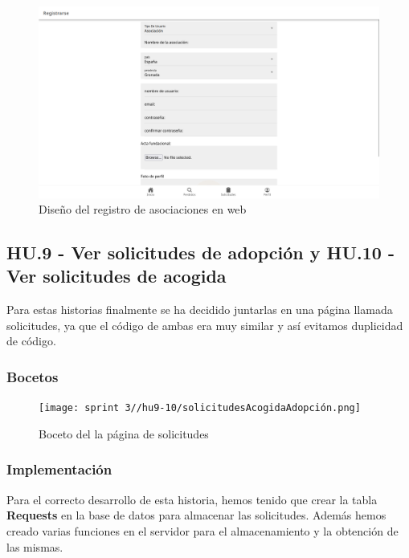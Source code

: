 \begin{figure}[H]
	\centering
	\includegraphics[width=0.8\linewidth]{sprint 3//hu8/implementacionWeb.png}
	\caption{Diseño del registro de asociaciones en web}
\end{figure}

\subsection{HU.9 - Ver solicitudes de adopción y HU.10 - Ver solicitudes de acogida}

Para estas historias finalmente se ha decidido juntarlas en una página llamada solicitudes, ya que el código de ambas era muy similar y así evitamos duplicidad de código. \\

\subsubsection{Bocetos}
\begin{figure}[H]
	\centering
	\texttt{[image: sprint 3//hu9-10/solicitudesAcogidaAdopción.png]}
	\caption{Boceto del la página de solicitudes}
	\label{fig:boceto_adopt}
\end{figure}


\subsubsection{Implementación}

Para el correcto desarrollo de esta historia, hemos tenido que crear la tabla \textbf{Requests} en la base de datos para almacenar las solicitudes. Además hemos creado varias funciones en el servidor para el almacenamiento y la obtención de las mismas.

